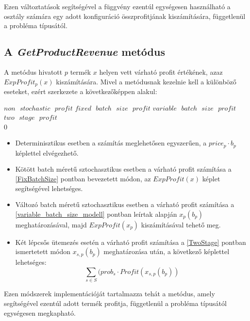 Ezen változtatások segítségével a  függvény ezentúl egységesen használható a  osztály számára egy adott konfiguráció összprofitjának kiszámítására, függetlenül a probléma típusától. 
\subsection{A \textit{GetProductRevenue} metódus} \label{getProductRevenue}
A  metódus hivatott $p$ termék $x$ helyen vett várható profit értékének, azaz $ExpProfit_p(x)$ kiszámítására.
Mivel a metódusnak kezelnie kell a különböző eseteket, ezért szerkezete a következőképpen alakul: 
\begin{algorithmic}
 \Return $non \text{ } stochastic \text{ } profit$
\EndIf
{} \Return $fixed \text{ } batch \text{ } size \text{ } profit$
\EndIf
{} \Return $variable \text{ } batch \text{ } size \text{ } profit$
\EndIf
{} \Return $two \text{ } stage \text{ } profit$
\EndIf\\
\Return $0$
\EndProcedure
\end{algorithmic}


\begin{itemize}
\item Determinisztikus esetben a számítás meglehetősen egyszerűen, a $price_p \cdot b_p$ képlettel elvégezhető.
\item Kötött batch méretű sztochasztikus esetben a várható profit számítása a \ref{FixBatchSize} pontban bevezetett módon, az $ExpProfit(x)$ képlet segítségével lehetséges.
\item Változó batch méretű sztochasztikus esetben a várható profit számítása a \ref{variable_batch_size_modell} pontban leírtak alapján $x_p(b_p)$ meghatározásával, majd $ExpProfit(x_p)$ kiszámításával tehető meg.
\item Két lépcsős ütemezés esetén a várható profit számítása a \ref{TwoStage} pontban ismertetett módon $x_{s,p}(b_p)$  meghatározása után, a következő képlettel lehetséges:
$$ \sum_{s \in S}(prob_s \cdot Profit(x_{s,p}(b_p))$$ 
\end{itemize}
Ezen módszerek implementációját tartalmazza tehát a  metódus, amely segítségével ezentúl adott termék profitja, függetlenül a probléma típusától egységesen megkapható.
